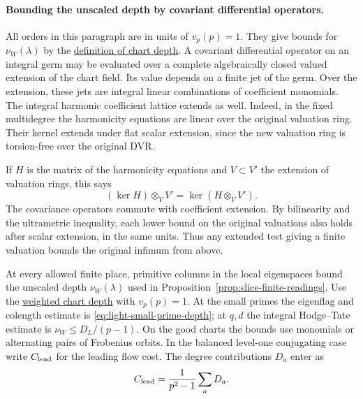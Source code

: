 \paragraph{Bounding the unscaled depth by covariant differential operators.}
\label{par:unscaled-light-depth}
All orders in this paragraph are in units of \(v_p(p)=1\).
They give bounds for \(\nu_W(\lambda)\) by the
\hyperref[par:slice-finite-depth]{definition of chart depth}.
A covariant differential operator on an integral germ may be evaluated over a complete algebraically closed valued extension of the chart field. Its value depends on a finite jet of the germ. Over the extension,
these jets are integral linear combinations of coefficient
monomials. The integral harmonic coefficient lattice
extends as well. Indeed, in the fixed multidegree the
harmonicity equations are linear over the original
valuation ring. Their kernel extends under flat scalar
extension, since the new valuation ring is torsion-free
over the original DVR.

If \(H\) is the matrix of the harmonicity equations and \(V\subset V'\) the extension of valuation rings, this says
\[
  (\ker H)\otimes_V V'=\ker(H\otimes_V V').
\]
 The covariance operators commute
with coefficient extension. By bilinearity and the
ultrametric inequality, each lower bound on the original valuations also holds after scalar extension, in the same units. Thus any extended test giving a finite valuation bounds the original infimum from above.
\label{cor:slice-unscaled-depth-1}

\begin{proposition}
\label{prop:primitive-light-covariants}
At every allowed finite place, primitive columns in the local
eigenspaces bound the unscaled depth \(\nu_W(\lambda)\) used in
Proposition~\ref{prop:slice-finite-readings}. Use the
\hyperref[par:slice-finite-depth]{weighted chart depth} with \(v_p(p)=1\).
At the small primes the eigenflag and colength estimate is
\eqref{eq:light-small-prime-depth}; at \(q,d\) the integral
Hodge--Tate estimate is \(\nu_W\le D_L/(p-1)\). On the good charts
the bounds use monomials or alternating pairs of Frobenius orbits. In the balanced level-one conjugating case write \(C_{\rm lead}\) for the leading flow cost. The degree contributions \(D_a\) enter as
\[
 C_{\rm lead}=\frac1{p^2-1}\sum_a D_a.
\]

\end{proposition}

